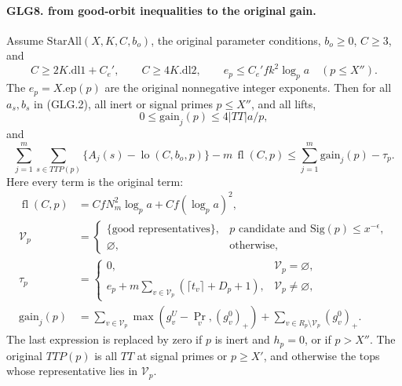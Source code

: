 \paragraph{GLG8. from good-orbit inequalities to the original gain.}
\label{claim:GLG8}
Assume \(\mathrm{StarAll}(X,K,C,b_o)\), the original parameter
conditions, \(b_o\ge0\), \(C\ge3\), and
\[
 C\ge2K.\mathrm{dl1}+C_e',\qquad C\ge4K.\mathrm{dl2},\qquad
 e_p\le C_e'f k^2\log_pa\quad(p\le X'').                           \tag{GLG.27}
\]
The \(e_p=X.\mathrm{ep}(p)\) are the original nonnegative
integer exponents. Then for all \(a_s,b_s\) in (GLG.2), all
inert or signal primes \(p\le X''\), and all lifts,
\[
 0\le\mathrm{gain}_j(p)\le4|TT|a/p,                               \tag{GLG.28}
\]
and
\[
 \sum_{j=1}^m\sum_{s\in TTP(p)}
                 \{A_j(s)-\operatorname{lo}(C,b_o,p)\}
       -m\,\operatorname{fl}(C,p)
        \le\sum_{j=1}^m\mathrm{gain}_j(p)-\tau_p .                 \tag{GLG.29}
\]
Here every term is the original term:
\[
 \begin{split}
 \operatorname{fl}(C,p)&=CfN_m^2\log_pa+Cf(\log_pa)^2,\\
 \mathcal V_p&=\begin{cases}
      \{\text{good representatives}\},&
      p\text{ candidate and }\mathrm{Sig}(p)\le x^{-\epsilon},\\
      \varnothing,&\text{otherwise},
      \end{cases}\\
 \tau_p&=\begin{cases}
      0,&\mathcal V_p=\varnothing,\\
      e_p+m\sum_{v\in\mathcal V_p}(\lceil t_v\rceil+D_p+1),
                                  &\mathcal V_p\ne\varnothing,
      \end{cases}\\
 \mathrm{gain}_j(p)&=
      \sum_{v\in\mathcal V_p}\max(g_v^U-\Pr_v,(g_v^0)_+)
      +\sum_{v\in R_p\setminus\mathcal V_p}(g_v^0)_+ .
 \end{split}                                                       \tag{GLG.30}
\]
The last expression is replaced by zero if \(p\) is inert
and \(h_p=0\), or if \(p>X''\). The original \(TTP(p)\)
is all \(TT\) at signal primes or \(p\ge X'\), and otherwise
the tops whose representative lies in \(\mathcal V_p\).

